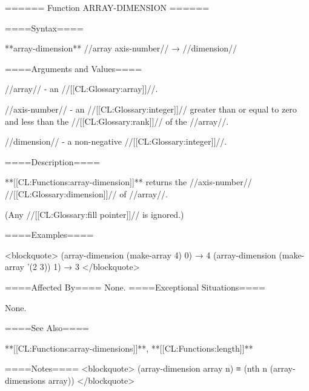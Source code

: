 ====== Function ARRAY-DIMENSION ======

====Syntax====

**array-dimension** //array axis-number// → //dimension//

====Arguments and Values====

//array// - an //[[CL:Glossary:array]]//.

//axis-number// - an //[[CL:Glossary:integer]]// greater than or equal to zero and less than the //[[CL:Glossary:rank]]// of the //array//.

//dimension// - a non-negative //[[CL:Glossary:integer]]//.

====Description====

**[[CL:Functions:array-dimension]]** returns the //axis-number// //[[CL:Glossary:dimension]]// of //array//.

(Any //[[CL:Glossary:fill pointer]]// is ignored.)

====Examples====

<blockquote> (array-dimension (make-array 4) 0) → 4 (array-dimension (make-array '(2 3)) 1) → 3 </blockquote>

====Affected By==== None. ====Exceptional Situations====

None.

====See Also====

**[[CL:Functions:array-dimensions]]**, **[[CL:Functions:length]]**

====Notes==== <blockquote> (array-dimension array n) ≡ (nth n (array-dimensions array)) </blockquote>

